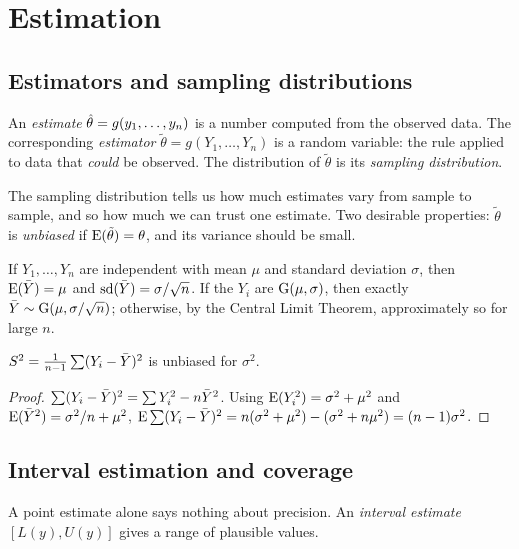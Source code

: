 \chapter{Estimation}

\section{Estimators and sampling distributions}

\begin{definition}
An \emph{estimate} $\hat{\theta} = g(y_1,\dots,y_n)$ is a number computed from the observed
data. The corresponding \emph{estimator} $\tilde\theta = g(Y_1,\dots,Y_n)$ is a random
variable: the rule applied to data that \emph{could} be observed. The distribution of
$\tilde\theta$ is its \emph{sampling distribution}.
\end{definition}

The sampling distribution tells us how much estimates vary from sample to sample, and so
how much we can trust one estimate. Two desirable properties: $\tilde\theta$ is
\emph{unbiased} if $\operatorname{E}(\tilde\theta) = \theta$, and its variance should be small.

\begin{theorem}
If $Y_1,\dots,Y_n$ are independent with mean $\mu$ and standard deviation $\sigma$, then
$\operatorname{E}(\bar{Y}) = \mu$ and $\operatorname{sd}(\bar{Y}) = \sigma/\sqrt n$. If the $Y_i$ are $\operatorname{G}(\mu,\sigma)$,
then exactly $\bar{Y}\sim\operatorname{G}(\mu,\sigma/\sqrt n)$; otherwise, by the Central Limit Theorem,
approximately so for large $n$.
\end{theorem}

\begin{theorem}
$S^2 = \frac{1}{n-1}\sum (Y_i-\bar{Y})^2$ is unbiased for $\sigma^2$.
\end{theorem}
\begin{proof}
$\sum(Y_i-\bar{Y})^2 = \sum Y_i^2 - n\bar{Y}^2$. Using $\operatorname{E}(Y_i^2) = \sigma^2+\mu^2$ and
$\operatorname{E}(\bar{Y}^2) = \sigma^2/n + \mu^2$,
$\operatorname{E}\sum(Y_i-\bar{Y})^2 = n(\sigma^2+\mu^2) - (\sigma^2 + n\mu^2) = (n-1)\sigma^2$.
\end{proof}

\section{Interval estimation and coverage}

A point estimate alone says nothing about precision. An \emph{interval estimate}
$[L(y), U(y)]$ gives a range of plausible values.

